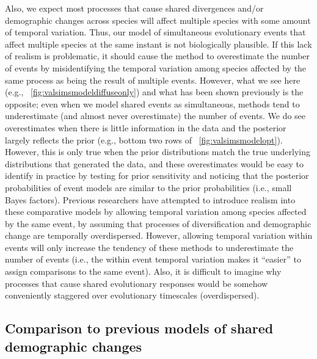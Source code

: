 Also, we expect most processes that cause shared divergences and/or demographic
changes across species will affect multiple species with some amount of
temporal variation.
Thus, our model of simultaneous evolutionary events that affect multiple
species at the same instant is not biologically plausible.
If this lack of realism is problematic, it should cause the method to
overestimate the number of events by misidentifying the temporal variation among
species affected by the same process as being the result of multiple events.
However, what we see here
(e.g., \fig{}~\ref{fig:valsimsmodeldiffuseonly})
and what has been shown previously
\citep{Oaks2012,Oaks2014reply,Oaks2014dpp,Oaks2018ecoevolity,Oaks2018paic}
is the opposite;
even when we model shared events as simultaneous, methods tend to underestimate
(and almost never overestimate) the number of events.
We do see overestimates when there is little information in the data
and the posterior largely reflects the prior 
(e.g., bottom two rows of \fig{}~\ref{fig:valsimsmodelopt}).
However, this is only true when the prior distributions match the true
underlying distributions that generated the data, and these overestimates would
be easy to identify in practice by testing for prior sensitivity and noticing
that the posterior probabilities of event models are similar to the prior
probabilities (i.e., small Bayes factors).
Previous researchers
\citep{Overcast2017,Gehara2017,Xue2017}
have attempted to introduce realism into these comparative models by allowing
temporal variation among species affected by the same event, by assuming that
processes of diversification and demographic change are temporally
overdispersed.
However, allowing temporal variation within events will only increase the
tendency of these methods to underestimate the number of events (i.e., the
within event temporal variation makes it ``easier'' to assign comparisons to
the same event).
Also, it is difficult to imagine why processes that cause shared evolutionary
responses would be somehow conveniently staggered over evolutionary timescales
(overdispersed).

\subsection{Comparison to previous models of shared demographic changes}

